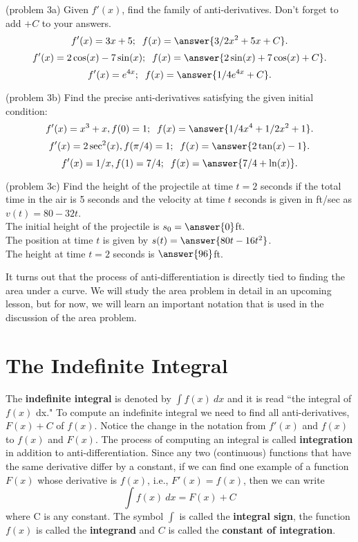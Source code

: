 \documentclass{ximera}
\begin{document}
\begin{problem}(problem 3a)
Given $f'(x)$, find the family of anti-derivatives. Don't forget to add $+C$ to your answers.
\[
f'(x) = 3x + 5; \;\; f(x) = \answer{3/2x^2 + 5x +C}.
\]
\[
f'(x) = 2\cos(x) - 7\sin(x); \;\; f(x) = \answer{2\sin(x) + 7\cos(x) +C}.
\]
\[
f'(x) = e^{4x}; \;\; f(x) = \answer{1/4e^{4x} +C}.
\]

\end{problem}



\begin{problem}(problem 3b)
Find the precise anti-derivatives satisfying the given initial condition:
\[
f'(x) = x^3 + x, f(0) = 1;\;\; f(x) = \answer{1/4x^4 + 1/2x^2 + 1}.
\]
\[
f'(x) = 2\sec^2(x), f(\pi/4) = 1; \;\; f(x) = \answer{2\tan(x) - 1}.
\]
\[
f'(x) = 1/x, f(1) = 7/4; \;\; f(x) = \answer{7/4 + \ln(x)}.
\]

\end{problem}



\begin{problem}(problem 3c)
Find the height of the projectile at time $t = 2$ seconds if the total time in the air is 5 seconds 
and the velocity at time $t$ seconds is given in ft/sec as $v(t) = 80-32t$.\\
The initial height of the projectile is $s_0 = \answer{0}$ft.\\
The position at time $t$ is given by $s(t) = \answer{80t - 16t^2}$.\\
The height at time $t = 2$ seconds is $\answer{96}$ft.\\
\end{problem}



It turns out that the process of anti-differentiation is directly tied to finding the area under a curve.
We will study the area problem in detail in an upcoming lesson, but for now, we will learn an important notation that
is used in the discussion of the area problem.



\section{The Indefinite Integral}

The \textbf{indefinite integral} is denoted by $\int f(x) \ dx$ and it is read ``the integral of $f(x)$ dx." To compute an indefinite integral we need to 
find all anti-derivatives, $F(x) + C$ of $f(x)$. Notice the change in the notation from $f'(x)$ and $f(x)$
to $f(x)$ and $F(x)$. The process of computing an integral is called \textbf{integration} in addition to anti-differentiation.  
Since any two (continuous) functions that have the same derivative differ by a constant, 
if we can find one example of a function $F(x)$ whose derivative is $f(x)$, i.e., $F'(x) = f(x)$, then we can write
\[\int f(x) \ dx = F(x) + C\]
where C is any constant.  The symbol $\int$ is called the \textbf{integral sign}, 
the function $f(x)$ is called the \textbf{integrand} and $C$ is called the \textbf{constant of integration}.  
\end{document}
